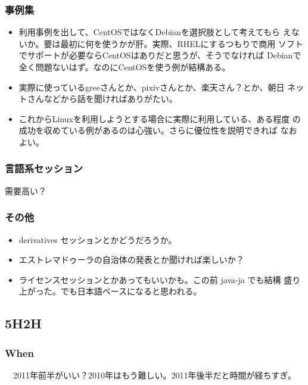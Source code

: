 \documentclass[mingoth,a4paper]{jsarticle}
\begin{document}
\subsubsection{事例集}
\begin{itemize}
 \item 利用事例を出して、CentOSではなくDebianを選択肢として考えてもら
       えないか。要は最初に何を使うかが肝。実際、RHELにするつもりで商用
       ソフトでサポートが必要ならCentOSはありだと思うが、そうでなければ
       Debianで全く問題ないはず。なのにCentOSを使う例が結構ある。
 \item 実際に使っているgreeさんとか、pixivさんとか、楽天さん？とか、朝日
       ネットさんなどから話を聞ければありがたい。
 \item これからLinuxを利用しようとする場合に実際に利用している、ある程度
       の成功を収めている例があるのは心強い。さらに優位性を説明できれば
       なおよい。
\end{itemize}

\subsubsection{言語系セッション}
需要高い？

\subsubsection{その他}
\begin{itemize}
\item derivatives セッションとかどうだろうか。
\item エストレマドゥーラの自治体の発表とか聞ければ楽しいか？
\item ライセンスセッションとかあってもいいかも。この前 java-ja でも結構
      盛り上がった。でも日本語ベースになると思われる。
\end{itemize}

\subsection{5H2H}
\subsubsection{When}
　2011年前半がいい？2010年はもう難しい。2011年後半だと時間が経ちすぎ。
\end{document}
